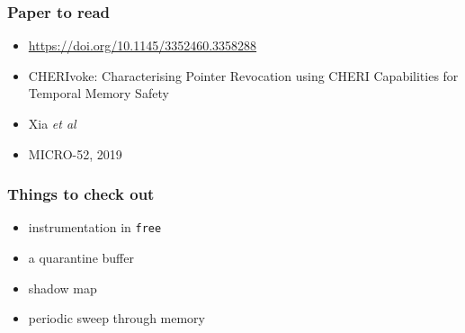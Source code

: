 \documentclass[20pt]{beamer}
\begin{document}
\begin{frame}
  \frametitle{Paper to read}

  \begin{itemize}
  \item \url{https://doi.org/10.1145/3352460.3358288}
  \item{CHERIvoke: Characterising Pointer Revocation using CHERI Capabilities for Temporal Memory Safety}
  \item Xia \emph{et al}
    \item MICRO-52, 2019
  \end{itemize}
   \end{frame}

   \begin{frame}
  \frametitle{Things to check out}
     \begin{itemize}
     \item instrumentation in \texttt{free}
     \item a quarantine buffer
     \item shadow map
     \item periodic sweep through memory
    \end{itemize}
  

\end{frame}
\end{document}
